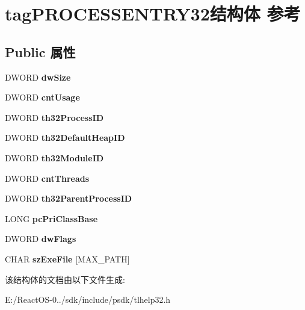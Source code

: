 \hypertarget{structtag_p_r_o_c_e_s_s_e_n_t_r_y32}{}\section{tag\+P\+R\+O\+C\+E\+S\+S\+E\+N\+T\+R\+Y32结构体 参考}
\label{structtag_p_r_o_c_e_s_s_e_n_t_r_y32}
\subsection*{Public 属性}
\begin{DoxyCompactItemize}
\item 
\mbox{\label{structtag_p_r_o_c_e_s_s_e_n_t_r_y32_ac661c8017f91698a5b36dfb842ba42de}} 
D\+W\+O\+RD {\bfseries dw\+Size}
\item 
\mbox{\label{structtag_p_r_o_c_e_s_s_e_n_t_r_y32_a4e31e9b282a13e8b68979ca016660b7c}} 
D\+W\+O\+RD {\bfseries cnt\+Usage}
\item 
\mbox{\label{structtag_p_r_o_c_e_s_s_e_n_t_r_y32_a8658ba8ba982ce735925b197fa483c1a}} 
D\+W\+O\+RD {\bfseries th32\+Process\+ID}
\item 
\mbox{\label{structtag_p_r_o_c_e_s_s_e_n_t_r_y32_a1f43e587677c39c2309f34416ada33f2}} 
D\+W\+O\+RD {\bfseries th32\+Default\+Heap\+ID}
\item 
\mbox{\label{structtag_p_r_o_c_e_s_s_e_n_t_r_y32_a6414fe5035f39da77210ab25936c7138}} 
D\+W\+O\+RD {\bfseries th32\+Module\+ID}
\item 
\mbox{\label{structtag_p_r_o_c_e_s_s_e_n_t_r_y32_a85f2d92eb04192f9efd99f4730086040}} 
D\+W\+O\+RD {\bfseries cnt\+Threads}
\item 
\mbox{\label{structtag_p_r_o_c_e_s_s_e_n_t_r_y32_a1970d21505b45a9fb3b2f2b2df4e9feb}} 
D\+W\+O\+RD {\bfseries th32\+Parent\+Process\+ID}
\item 
\mbox{\label{structtag_p_r_o_c_e_s_s_e_n_t_r_y32_a6b3febb1685ff56d646af03dd89f00f7}} 
L\+O\+NG {\bfseries pc\+Pri\+Class\+Base}
\item 
\mbox{\label{structtag_p_r_o_c_e_s_s_e_n_t_r_y32_ad4322de14e75a39da3af978b509605c1}} 
D\+W\+O\+RD {\bfseries dw\+Flags}
\item 
\mbox{\label{structtag_p_r_o_c_e_s_s_e_n_t_r_y32_a399286d4cb3edbd18f51148b9608620d}} 
C\+H\+AR {\bfseries sz\+Exe\+File} \mbox{[}M\+A\+X\+\_\+\+P\+A\+TH\mbox{]}
\end{DoxyCompactItemize}


该结构体的文档由以下文件生成\+:\begin{DoxyCompactItemize}
\item 
E\+:/\+React\+O\+S-\/0../sdk/include/psdk/tlhelp32.\+h\end{DoxyCompactItemize}
